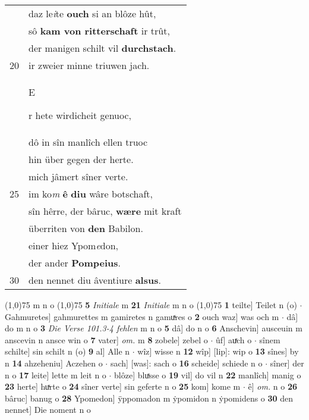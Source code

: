 \documentclass[8pt,a4paper,notitlepage]{article}
\begin{document}
\begin{table}[ht]
\begin{minipage}[t]{0.5\linewidth}
\begin{tabular}{rl}
 & daz le\textit{i}te \textbf{ouch} si an blôze hût,\\ 
 & sô \textbf{kam von ritterschaft} ir trût,\\ 
 & der manigen schilt vil \textbf{durchstach}.\\ 
20 & ir zweier minne triuwen jach.\\ 
 & \begin{large}E\end{large}r hete wirdicheit genuoc,\\ 
 & dô in sîn manlîch ellen truoc\\ 
 & hin über gegen der herte.\\ 
 & mich jâmert sîner verte.\\ 
25 & im ko\textit{m} \textbf{ê} \textbf{diu} wâre botschaft,\\ 
 & sîn hêrre, der bâruc, \textbf{wære} mit kraft\\ 
 & überriten von \textbf{den} Babilon.\\ 
 & einer hiez Ypom\textit{e}don,\\ 
 & der ander \textbf{Pompeius}.\\ 
30 & den nennet diu âventiure \textbf{alsus}.\\ 
\end{tabular}
\scriptsize
\line(1,0){75} \newline
m n o \newline
\line(1,0){75} \newline
\textbf{5} \textit{Initiale} m  \textbf{21} \textit{Initiale} m n o  \newline
\line(1,0){75} \newline
\textbf{1} teilte] Teilet n (o)  $\cdot$ Gahmuretes] gahmurettes m gamiretes n gamuͯres o \textbf{2} ouch waz] was och m  $\cdot$ dâ] do m n o \textbf{3} \textit{Die Verse 101.3-4 fehlen} m n o  \textbf{5} dâ] do n o \textbf{6} Anschevin] ausceuin m anscevin n ansce win o \textbf{7} vater] \textit{om.} m \textbf{8} zobele] zebel o  $\cdot$ ûf] auͯch o  $\cdot$ sînem schilte] sin schilt n (o) \textbf{9} al] Alle n  $\cdot$ wîz] wisse n \textbf{12} wîp] [lip]: wip o \textbf{13} sînes] by n \textbf{14} ahzeheniu] Aczehen o  $\cdot$ sach] [was]: sach o \textbf{16} scheide] schiede n o  $\cdot$ sîner] der n o \textbf{17} leite] lette m leit n o  $\cdot$ blôze] bluͯsse o \textbf{19} vil] do vil n \textbf{22} manlîch] manig o \textbf{23} herte] huͯrte o \textbf{24} sîner verte] sin geferte n o \textbf{25} kom] kome m  $\cdot$ ê] \textit{om.} n o \textbf{26} bâruc] banug o \textbf{28} Ypomedon] ÿppomadon m ẏpomidon n ẏpomidens o \textbf{30} den nennet] Die noment n o \newline
\end{minipage}
\end{table}
\end{document}
